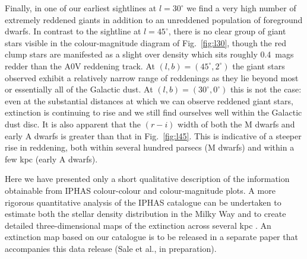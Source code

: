 \documentclass[useAMS,usenatbib]{mn2e}
\begin{document}
Finally, in one of our earliest sightlines at $l=30^{\circ}$
we find a very high number of extremely reddened giants
in addition to an unreddened population
of foreground dwarfs.
In contrast to the sightline at $l=45^{\circ}$,
there is no clear group of giant stars visible
in the colour-magnitude diagram of Fig.~\ref{fig:l30},
though the red clump stars are manifested as a slight over density
which sits roughly 0.4~mags redder than the A0V reddening track.
At $(l,b)=(45^{\circ}, 2^{\circ})$ the giant stars observed
exhibit a relatively narrow range of reddenings
as they lie beyond most or essentially all of the Galactic dust.
At $(l,b)=(30^{\circ}, 0^{\circ})$ this is not the case:
even at the substantial distances
at which we can observe reddened giant stars,
extinction is continuing to rise
and we still find ourselves well within the Galactic dust disc.
It is also apparent that the $(r-i)$ width of both the M dwarfs
and early A dwarfs is greater than that in Fig.~\ref{fig:l45}.
This is indicative of a steeper rise in reddening,
both within several hundred parsecs (M dwarfs)
and within a few kpc (early A dwarfs).

Here we have presented only a short qualitative description
of the information obtainable
from IPHAS colour-colour and colour-magnitude plots.
A more rigorous quantitative analysis of the IPHAS catalogue
can be undertaken to estimate both
the stellar density distribution in the Milky Way \citep{Sale2010}
and to create detailed three-dimensional maps
of the extinction across several kpc \citep{Sale2009,Sale2012}.
An extinction map based on our catalogue
is to be released in a separate paper
that accompanies this data release (Sale et al., in preparation).
\end{document}
